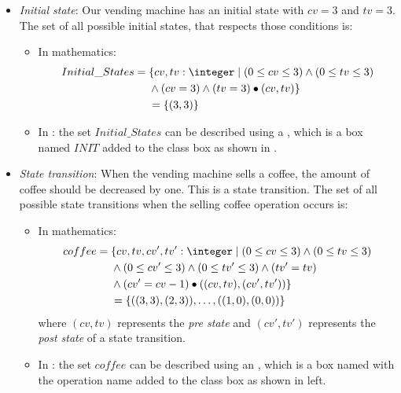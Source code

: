 \begin{itemize}
\item \textit{Initial state}: Our vending machine has an initial state with $cv = 3$ and $tv = 3$. The set of all possible initial states, that respects those conditions is:  
\begin{itemize}
\item In mathematics:
\begin{equation*}
\begin{aligned}
Initial\_States ={} & \{cv,tv: \integer\mid (0 \leq  cv \leq 3) \wedge (0 \leq  tv \leq 3)\\
      & \wedge (cv = 3) \wedge (tv = 3)\bullet(cv,tv)\} \\
      &  =\{\pair{3}{3}\}
\end{aligned}
\end{equation*}
\item In \oz{}: the set $Initial\_States$ can be described using a , which is a box named $INIT$ added to the class box  as shown in .
\end{itemize}


\item \textit{State transition}: When the vending machine sells a coffee, the amount of coffee should be decreased by one. This is a state transition.
The set of all possible state transitions when the selling coffee operation occurs is:
\begin{itemize}
\item In mathematics:
\begin{equation*}
\begin{aligned}
coffee ={} & \{cv,tv,cv',tv': \integer\mid (0 \leq  cv \leq 3) \wedge (0 \leq  tv \leq 3)\\
      & \wedge (0 \leq  cv' \leq 3) \wedge (0 \leq  tv' \leq 3)\wedge (tv' = tv)  \\
      & \wedge (cv' = cv - 1) \bullet\pair{\pair{cv}{tv}}{\pair{cv'}{tv'}}\} \\
      & =\{\pair{\pair{3}{3}}{\pair{2}{3}},\dots,\pair{\pair{1}{0}}{\pair{0}{0}}\}
\end{aligned}
\end{equation*}
 where $(cv,tv)$ represents the \textit{pre state} and $(cv',tv')$ represents the \textit{post state} of a state transition.
\item In \oz{}: the set $coffee$ can be described using an , which is a box named with the operation name added to the class box as shown in  left.
\end{itemize}


\end{itemize}
